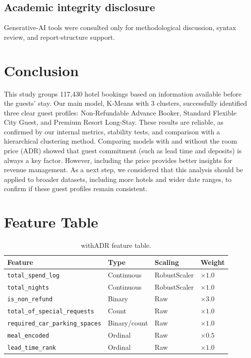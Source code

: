 \documentclass[11pt,a4paper]{article}
\begin{document}
\subsection{Academic integrity disclosure}
Generative-AI tools were consulted only for methodological discussion, syntax review, and report-structure support.

\section{Conclusion}
This study groups 117,430 hotel bookings based on information available before the guests' stay. Our main model, K-Means with 3 clusters, successfully identified three clear guest profiles: Non-Refundable Advance Booker, Standard Flexible City Guest, and Premium Resort Long-Stay. These results are reliable, as confirmed by our internal metrics, stability tests, and comparison with a hierarchical clustering method. Comparing models with and without the room price (ADR) showed that guest commitment (such as lead time and deposits) is always a key factor. However, including the price provides better insights for revenue management. As a next step, we considered that this analysis should be applied to broader datasets, including more hotels and wider date ranges, to confirm if these guest profiles remain consistent.
\appendix

\section{Feature Table}
\begin{table}[H]
\centering
\caption{withADR feature table.}
\begin{tabular}{llll}
\toprule
\textbf{Feature} & \textbf{Type} & \textbf{Scaling} & \textbf{Weight} \\
\midrule
\texttt{total\_spend\_log} & Continuous & RobustScaler & $\times 1.0$ \\
\texttt{total\_nights} & Continuous & RobustScaler & $\times 1.0$ \\
\texttt{is\_non\_refund} & Binary & Raw & $\times 3.0$ \\
\texttt{total\_of\_special\_requests} & Count & Raw & $\times 1.0$ \\
\texttt{required\_car\_parking\_spaces} & Binary/count & Raw & $\times 1.0$ \\
\texttt{meal\_encoded} & Ordinal & Raw & $\times 0.5$ \\
\texttt{lead\_time\_rank} & Ordinal & Raw & $\times 1.0$ \\
\bottomrule
\end{tabular}
\end{table}
\end{document}
